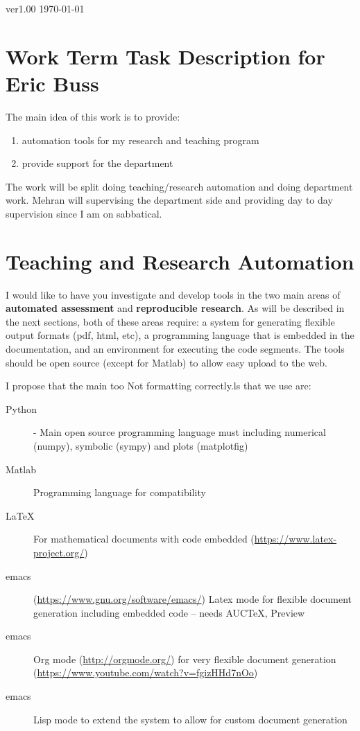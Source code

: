 \documentclass[12pt]{article}
\begin{document}
ver1.00 \hfill  \today
\section*{Work Term Task Description for Eric Buss}

The main idea of this work is to provide:
\begin{enumerate}
  \item automation tools for my research and teaching program
  \item provide support for the department
\end{enumerate}
The work will be split doing teaching/research automation and doing department work. Mehran will supervising the department side and providing day to day supervision since I am on sabbatical.


\section{Teaching and Research Automation}

I would like to have you investigate and develop tools in the two main areas of \textbf{automated assessment} and \textbf{reproducible research}. As will be described in the next sections, both of these areas require: a system for generating flexible output formats (pdf, html, etc), a programming language that is embedded in the documentation, and an environment for executing the code segments. The tools should be open source (except for Matlab) to allow easy upload to the web.



I propose that the main too    Not formatting correctly.ls that we use are:
\begin{description}
  \item[Python]  - Main open source programming language must including numerical (numpy), symbolic (sympy) and plots (matplotfig)
  \item[Matlab] Programming language for compatibility
  \item[\LaTeX] For mathematical documents with code embedded (\url{https://www.latex-project.org/})
  \item[emacs] (\url{https://www.gnu.org/software/emacs/}) Latex mode for flexible document generation including embedded code --  needs AUCTeX, Preview
  \item[emacs] Org mode (\url{http://orgmode.org/}) for very flexible document generation \\
     (\url{https://www.youtube.com/watch?v=fgizHHd7nOo})
  \item[emacs] Lisp mode to extend the system to allow for custom document generation
\end{description}
\end{document}
